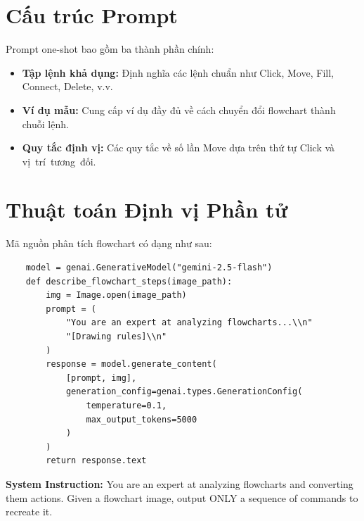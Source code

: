 \documentclass[a4paper, 12pt]{report}
\begin{document}
{\section{Cấu trúc Prompt}
Prompt one-shot bao gồm ba thành phần chính:
\begin{itemize}
\item \textbf{Tập lệnh khả dụng:} Định nghĩa các lệnh chuẩn như Click, Move, Fill, Connect, Delete, v.v.
\item \textbf{Ví dụ mẫu:} Cung cấp ví dụ đầy đủ về cách chuyển đổi flowchart thành chuỗi lệnh.
\item \textbf{Quy tắc định vị:} Các quy tắc về số lần Move dựa trên thứ tự Click và vị~trí~tương~đối.
\end{itemize}

\section{Thuật toán Định vị Phần tử}

Mã nguồn phân tích flowchart có dạng như sau:
{\footnotesize
\begin{verbatim}
    model = genai.GenerativeModel("gemini-2.5-flash")
    def describe_flowchart_steps(image_path):
        img = Image.open(image_path)
        prompt = (
            "You are an expert at analyzing flowcharts...\\n"
            "[Drawing rules]\\n"
        )
        response = model.generate_content(
            [prompt, img],
            generation_config=genai.types.GenerationConfig(
                temperature=0.1,
                max_output_tokens=5000
            )
        )
        return response.text
\end{verbatim}
}





\begin{tcolorbox}[
    colback=gray!10,
    colframe=gray!50!black,
    title=Nội dung prompt,
    fonttitle=\bfseries,
    coltitle=white,
    colbacktitle=gray!50!black,
    before skip=5pt,
    after skip=5pt
]
\footnotesize %

\textbf{System Instruction:}
You are an expert at analyzing flowcharts and converting them actions.
Given a flowchart image, output ONLY a sequence of commands to recreate it.


\end{tcolorbox}}
\end{document}
